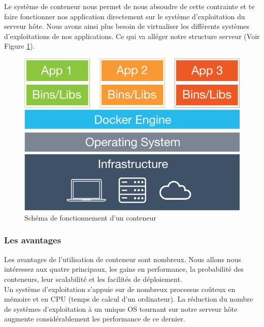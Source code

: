 \documentclass{report}
\begin{document}
        Le système de conteneur nous permet de nous absoudre de cette contrainte et te faire fonctionner nos application directement sur le système d’exploitation du serveur hôte. Nous avons ainsi plus besoin de virtualiser les différents systèmes d’exploitations de nos applications. Ce qui va alléger notre structure serveur (Voir Figure \ref{Container}).

        \begin{figure}
          \begin{center}
            \includegraphics[scale=0.2]{images/container.png}
          \end{center}
          \caption{Schéma de fonctionnement d'un conteneur}
          \label{Container}
        \end{figure}

        \subsubsection{Les avantages}
        Les avantages de l’utilisation de conteneur sont nombreux. Nous allons nous intéressez aux quatre principaux, les gains en performance, la probabilité des conteneurs, leur scalabilité et les facilités de déploiement.\\

        Un système d’exploitation s’appuie sur de nombreux processus coûteux en mémoire et en CPU (temps de calcul d’un ordinateur). La réduction du nombre de systèmes d’exploitation à un unique OS tournant sur notre serveur hôte augmente considérablement les performance de ce dernier.\\
\end{document}
